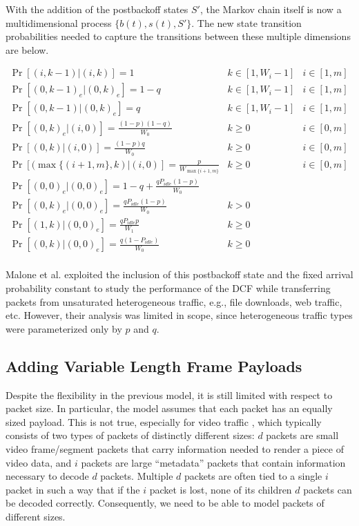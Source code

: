\documentclass[conference]{IEEEtran}
\begin{document}
With the addition of the postbackoff states $S'$, the Markov chain itself is now a multidimensional process $\{b(t), s(t), S' \}$. The new state transition probabilities needed to capture the transitions between these multiple dimensions are below.

\begin{center}
\begin{math}
\boxed{
\begin{array}{lll}
\Pr[(i,k-1) | (i, k)] = 1 & k \in [1, W_i-1] & i \in [1,m] \\
\Pr[(0,k-1)_e | (0, k)_e] = 1-q & k \in [1, W_i-1] & i \in [1,m] \\
\Pr[(0,k-1) | (0, k)_e] = q & k \in [1, W_i-1] & i \in [1,m] \\
\Pr[(0,k)_e | (i, 0)] = \frac{(1-p)(1-q)}{W_0} & k \geq 0 & i \in [0,m] \\
\Pr[(0,k) | (i, 0)] = \frac{(1-p)q}{W_0} & k \geq 0 & i \in [0,m] \\
\Pr[(\max\{(i+1,m\}, k) | (i, 0)] = \frac{p}{W_{\max\{i+1,m\}}} & k \geq 0 & i \in [0,m] \\
\Pr[(0,0)_e | (0, 0)_e] = 1 - q + \frac{qP_{idle}(1 - p)}{W_0} & ~ \\
\Pr[(0,k)_e | (0, 0)_e] = \frac{qP_{idle}(1 - p)}{W_0} & k > 0 \\
\Pr[(1,k) | (0, 0)_e] = \frac{qP_{idle}p}{W_1} & k \geq 0 \\
\Pr[(0,k) | (0, 0)_e] = \frac{q(1 - P_{idle})}{W_0} & k \geq 0 \\
\end{array}
}
\end{math}
\end{center}

Malone et al. \cite{dcf-nonsaturated} exploited the inclusion of this postbackoff state and the fixed arrival probability constant to study the performance of the DCF while transferring packets from unsaturated heterogeneous traffic, e.g., file downloads, web traffic, etc. However, their analysis was limited in scope, since heterogeneous traffic types were parameterized only by $p$ and $q$.

\subsection{Adding Variable Length Frame Payloads}
Despite the flexibility in the previous model, it is still limited with respect to packet size. In particular, the model assumes that each packet has an equally sized payload. This is not true, especially for video traffic \cite{badia2010markov}, which typically consists of two types of packets of distinctly different sizes: $d$ packets are small video frame/segment packets that carry information needed to render a piece of video data, and $i$ packets are large ``metadata'' packets that contain information necessary to decode $d$ packets. Multiple $d$ packets are often tied to a single $i$ packet in such a way that if the $i$ packet is lost, none of its children $d$ packets can be decoded correctly. Consequently, we need to be able to model packets of different sizes. 
\end{document}
